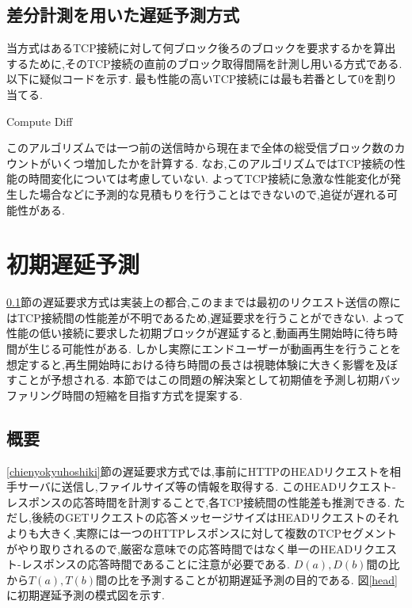 \documentclass[a4j,12pt]{gradthesis_utf8}
\begin{document}
\subsection{差分計測を用いた遅延予測方式}
\label{diff}
当方式はあるTCP接続に対して何ブロック後ろのブロックを要求するかを算出するために,そのTCP接続の直前のブロック取得間隔を計測し用いる方式である.
以下に疑似コードを示す.
最も性能の高いTCP接続には最も若番として0を割り当てる.

\begin{algorithm}
	\caption{Compute Diff}
	\begin{algorithmic}[1]
		\Else 
		\EndIf
	\end{algorithmic}
\end{algorithm}

このアルゴリズムでは一つ前の送信時から現在まで全体の総受信ブロック数のカウントがいくつ増加したかを計算する.
なお,このアルゴリズムではTCP接続の性能の時間変化については考慮していない.
よってTCP接続に急激な性能変化が発生した場合などに予測的な見積もりを行うことはできないので,追従が遅れる可能性がある.

\newpage

\section{初期遅延予測}
\label{shoki}
\ref{diff}節の遅延要求方式は実装上の都合,このままでは最初のリクエスト送信の際にはTCP接続間の性能差が不明であるため,遅延要求を行うことができない.
よって性能の低い接続に要求した初期ブロックが遅延すると,動画再生開始時に待ち時間が生じる可能性がある.
しかし実際にエンドユーザーが動画再生を行うことを想定すると,再生開始時における待ち時間の長さは視聴体験に大きく影響を及ぼすことが予想される.
本節ではこの問題の解決案として初期値を予測し初期バッファリング時間の短縮を目指す方式を提案する.

\subsection{概要}
\label{shokigaiyo}
\ref{chienyokyuhoshiki}節の遅延要求方式では,事前にHTTPのHEADリクエストを相手サーバに送信し,ファイルサイズ等の情報を取得する.
このHEADリクエスト-レスポンスの応答時間を計測することで,各TCP接続間の性能差も推測できる.
ただし,後続のGETリクエストの応答メッセージサイズはHEADリクエストのそれよりも大きく,実際には一つのHTTPレスポンスに対して複数のTCPセグメントがやり取りされるので,厳密な意味での応答時間ではなく単一のHEADリクエスト-レスポンスの応答時間であることに注意が必要である.
\begin{math}D(a), D(b)\end{math}間の比から\begin{math}T(a), T(b)\end{math}間の比を予測することが初期遅延予測の目的である.
図\ref{head}に初期遅延予測の模式図を示す.
\end{document}
